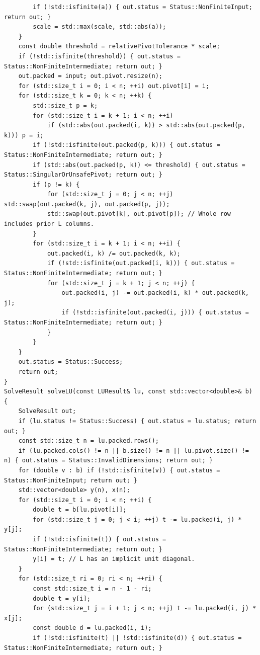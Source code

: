 \begin{verbatim}
        if (!std::isfinite(a)) { out.status = Status::NonFiniteInput; return out; }
        scale = std::max(scale, std::abs(a));
    }
    const double threshold = relativePivotTolerance * scale;
    if (!std::isfinite(threshold)) { out.status = Status::NonFiniteIntermediate; return out; }
    out.packed = input; out.pivot.resize(n);
    for (std::size_t i = 0; i < n; ++i) out.pivot[i] = i;
    for (std::size_t k = 0; k < n; ++k) {
        std::size_t p = k;
        for (std::size_t i = k + 1; i < n; ++i)
            if (std::abs(out.packed(i, k)) > std::abs(out.packed(p, k))) p = i;
        if (!std::isfinite(out.packed(p, k))) { out.status = Status::NonFiniteIntermediate; return out; }
        if (std::abs(out.packed(p, k)) <= threshold) { out.status = Status::SingularOrUnsafePivot; return out; }
        if (p != k) {
            for (std::size_t j = 0; j < n; ++j) std::swap(out.packed(k, j), out.packed(p, j));
            std::swap(out.pivot[k], out.pivot[p]); // Whole row includes prior L columns.
        }
        for (std::size_t i = k + 1; i < n; ++i) {
            out.packed(i, k) /= out.packed(k, k);
            if (!std::isfinite(out.packed(i, k))) { out.status = Status::NonFiniteIntermediate; return out; }
            for (std::size_t j = k + 1; j < n; ++j) {
                out.packed(i, j) -= out.packed(i, k) * out.packed(k, j);
                if (!std::isfinite(out.packed(i, j))) { out.status = Status::NonFiniteIntermediate; return out; }
            }
        }
    }
    out.status = Status::Success;
    return out;
}
SolveResult solveLU(const LUResult& lu, const std::vector<double>& b) {
    SolveResult out;
    if (lu.status != Status::Success) { out.status = lu.status; return out; }
    const std::size_t n = lu.packed.rows();
    if (lu.packed.cols() != n || b.size() != n || lu.pivot.size() != n) { out.status = Status::InvalidDimensions; return out; }
    for (double v : b) if (!std::isfinite(v)) { out.status = Status::NonFiniteInput; return out; }
    std::vector<double> y(n), x(n);
    for (std::size_t i = 0; i < n; ++i) {
        double t = b[lu.pivot[i]];
        for (std::size_t j = 0; j < i; ++j) t -= lu.packed(i, j) * y[j];
        if (!std::isfinite(t)) { out.status = Status::NonFiniteIntermediate; return out; }
        y[i] = t; // L has an implicit unit diagonal.
    }
    for (std::size_t ri = 0; ri < n; ++ri) {
        const std::size_t i = n - 1 - ri;
        double t = y[i];
        for (std::size_t j = i + 1; j < n; ++j) t -= lu.packed(i, j) * x[j];
        const double d = lu.packed(i, i);
        if (!std::isfinite(t) || !std::isfinite(d)) { out.status = Status::NonFiniteIntermediate; return out; }

\end{verbatim}
